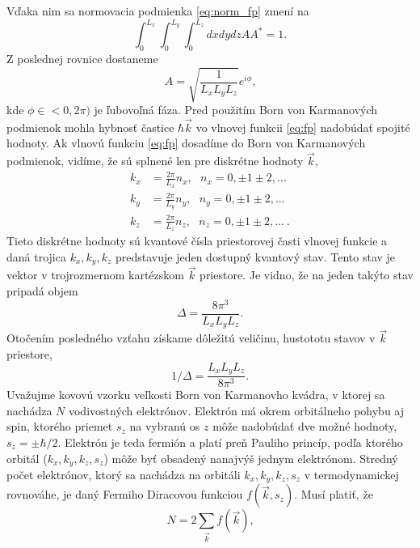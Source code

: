 Vďaka nim sa normovacia podmienka \eqref{eq:norm_fp} zmení na 
\begin{equation}
\label{eq:norm_bvk}
 \int_{0}^{L_x}  \int_{0}^{L_y}  \int_{0}^{L_z} dx dy dz  AA^\ast = 1\text{.}
\end{equation}
Z poslednej rovnice dostaneme
\begin{equation}
 \label{eq:A}
 A=\sqrt{\frac{1}{L_xL_yL_z}}e^{i\phi} \text{,}
\end{equation}
kde $\phi\in<0,2\pi)$  je ľubovoľná fáza.
Pred použitím Born von Karmanových podmienok mohla hybnosť častice $\hbar \vec k$ vo vlnovej funkcii \eqref{eq:fp} nadobúdať spojité hodnoty. Ak vlnovú funkciu \eqref{eq:fp} dosadíme do Born von Karmanových podmienok, vidíme, že
sú splnené len pre diskrétne hodnoty $\vec k$,
\begin{align*}
 k_x&=\frac{2\pi}{L_x}n_x , \ \ \  n_x=0,\pm 1 \pm 2, ...\\
 k_y&=\frac{2\pi}{L_y}n_y , \ \ \  n_y=0,\pm 1 \pm 2, ...\\
 k_z&=\frac{2\pi}{L_z}n_z , \ \ \  n_z=0,\pm 1 \pm 2, ...\ \text{.}
\end{align*}
Tieto diskrétne hodnoty sú  kvantové čísla priestorovej časti vlnovej funkcie a daná trojica ${k_x, k_y, k_z}$ predstavuje jeden dostupný kvantový stav. Tento stav je vektor v trojrozmernom kartézskom $\vec k$ priestore. Je vidno, že na jeden takýto stav  pripadá objem 
\begin{equation}
\label{eq:V}
\Delta =\frac{8\pi^3}{L_xL_yL_z}\text{.}
\end{equation}
Otočením posledného vzťahu získame dôležitú veličinu, hustototu stavov v $\vec k$ priestore, 
\begin{equation}
\label{eq:V otocene}
1/\Delta =\frac{L_xL_yL_z}{8\pi^3}  \text{.}
\end{equation}
Uvažujme kovovú vzorku veľkosti Born von Karmanovho kvádra, v ktorej sa nachádza $N$ vodivostných elektrónov. 
Elektrón má okrem orbitálneho pohybu aj spin, ktorého priemet ${s_z}$ na vybranú os ${z}$ môže nadobúdať  dve možné hodnoty, $s_z = \pm \hbar/2$. Elektrón je teda fermión a platí preň Pauliho princíp, podľa ktorého
orbitál ($k_x, k_y, k_z, s_z$) môže byť obsadený nanajvýš jednym elektrónom. Stredný počet elektrónov, ktorý sa nachádza na orbitáli ${k_x, k_y, k_z, s_z}$ v termodynamickej rovnováhe, je daný Fermiho Diracovou funkciou
$f(\vec k, s_z)$. Musí platiť, že
\begin{equation}
 \label{eq:N}
 N = 2 \sum_{\vec k} f(\vec k)  \text{,}
\end{equation}
